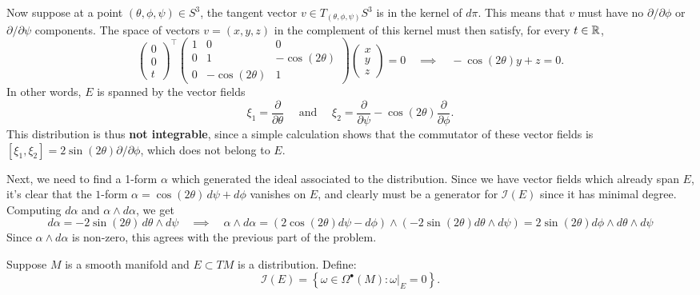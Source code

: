 \documentclass{../../templates/lkx_pset}
\begin{document}
\begin{parts}
	Now suppose at a point $(\theta,\phi,\psi)\in S^3$, the tangent vector $v\in T_{(\theta,\phi,\psi)} S^3$ is in the kernel of $d\pi$. This means that $v$ must have no $\partial/\partial \phi$ or $\partial /\partial \psi$ components. The space of vectors $v=(x,y,z)$ in the complement of this kernel must then satisfy, for every $t\in \mathbb{R}$,
	\[
		\begin{pmatrix}0 \\ 0 \\ t\end{pmatrix}^\intercal
		\begin{pmatrix} 1 & 0              & 0              \\
                0 & 1              & -\cos(2\theta) \\
                0 & -\cos(2\theta) & 1\end{pmatrix}\begin{pmatrix}x\\y\\z\end{pmatrix} = 0\quad\implies\quad -\cos (2\theta) y + z = 0.
	\]
	In other words, $E$ is spanned by the vector fields
	\[
		\xi_1= \frac{\partial}{\partial \theta}
		\quad\textrm{ and }\quad
		\xi_2 = \frac{\partial}{\partial \psi} - \cos(2\theta)\frac{\partial}{\partial \phi}.
	\]
	This distribution is thus \textbf{not integrable}, since a simple calculation shows that the commutator of these vector fields is $[\xi_1, \xi_2] = 2\sin(2\theta)\partial / \partial \phi$, which does not belong to $E$.

	Next, we need to find a 1-form $\alpha$ which generated the ideal associated to the distribution. Since we have vector fields which already span $E$, it's clear that the $1$-form $\alpha = \cos(2\theta)\,d\psi + d\phi$ vanishes on $E$, and clearly must be a generator for $\mathcal{I}(E)$ since it has minimal degree. Computing $d\alpha$ and $\alpha\wedge d\alpha$, we get
	\[
		d\alpha = -2\sin(2\theta)\,d\theta\wedge d\psi \quad\implies\quad \alpha\wedge d\alpha = (2\cos(2\theta)d\psi - d\phi) \wedge (-2\sin(2\theta) d\theta \wedge d\psi) = 2\sin(2\theta)d\phi\wedge d\theta\wedge d\psi
	\]
	Since $\alpha\wedge d\alpha$ is non-zero, this agrees with the previous part of the problem.
\end{parts}

\begin{problem}{2}
Suppose $M$ is a smooth manifold and $E\subset TM$ is a distribution. Define:
\[
	\mathcal{I}(E) = \left\{ \omega \in \Omega^\bullet(M) : \omega|_E = 0\right\}.
\]
\end{problem}
\end{document}
